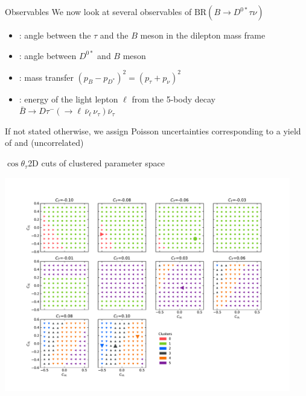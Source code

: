 \begin{frame}{Observables}
	We now look at several observables of $\mathrm{BR}(B\to D^{0*} \tau\nu)$
	\begin{itemize}
		\item \hhl{$\theta_\tau$}: angle between the $\tau$ and the $B$ meson in the dilepton mass frame
		\item {}: angle between $D^{0*}$ and $B$ meson
		\item {}: mass transfer $(p_B-p_{D^*})^2=(p_\tau+p_\nu)^2$
		\item {}: energy of the light lepton $\ell$ from the 5-body decay $\bar B\to D \tau^-(\to\ell\, \bar\nu_\ell\,\nu_\tau)\bar\nu_\tau$
	\end{itemize}

	If not stated otherwise, we assign Poisson uncertainties corresponding to a yield of  and  (uncorrelated)
\end{frame}

\begin{frame}{$\cos\theta_\tau$}{2D cuts of clustered parameter space}
	\begin{changemargin}{-1cm}{-1cm}
		\centering
		\includegraphics[width=12.5cm,clip,trim=0cm 0cm 0cm 2cm]{figures/from-paper/cosl_clust2D.pdf}
	\end{changemargin}
\end{frame}
%

